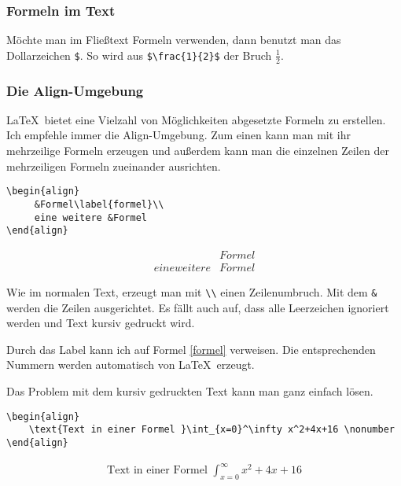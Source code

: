 \subsubsection{Formeln im Text}

Möchte man im Fließtext Formeln verwenden, dann benutzt man das Dollarzeichen \verb+$+. So wird aus \verb+$\frac{1}{2}$+ der Bruch $\frac{1}{2}$.

\subsubsection{Die Align-Umgebung}

\LaTeX\ bietet eine Vielzahl von Möglichkeiten abgesetzte Formeln zu erstellen. Ich empfehle immer die Align-Umgebung. Zum einen kann man mit ihr mehrzeilige Formeln erzeugen und außerdem kann man die einzelnen Zeilen der mehrzeiligen Formeln zueinander ausrichten.

\begin{verbatim}
\begin{align}
     &Formel\label{formel}\\
     eine weitere &Formel
\end{align}
\end{verbatim}

\begin{align}
    &Formel\label{formel}\\
    eine weitere &Formel
\end{align}

Wie im normalen Text, erzeugt man mit \verb+\\+ einen Zeilenumbruch. Mit dem \verb+&+ werden die Zeilen ausgerichtet. Es fällt auch auf, dass alle Leerzeichen ignoriert werden und Text kursiv gedruckt wird.

Durch das Label kann ich auf Formel \ref{formel} verweisen. Die entsprechenden Nummern werden automatisch von \LaTeX\ erzeugt.

Das Problem mit dem kursiv gedruckten Text kann man ganz einfach lösen.

\begin{verbatim}
\begin{align}
    \text{Text in einer Formel }\int_{x=0}^\infty x^2+4x+16 \nonumber
\end{align}
\end{verbatim}

\begin{align}
    \text{Text in einer Formel }\int_{x=0}^\infty x^2+4x+16 \nonumber
\end{align}

